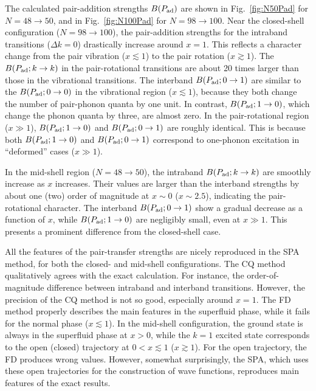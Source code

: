 \documentclass[%
superscriptaddress,
preprint,
showpacs,
nofootinbib,
amsmath,amssymb,
aps,
prc,
floatfix ]%
{revtex4-1}
\begin{document}
The calculated pair-addition strengths $B(P_{\rm ad})$ are shown in
Fig.~\ref{fig:N50Pad} for $N=48\rightarrow 50$,
and in Fig.~\ref{fig:N100Pad} for $N=98\rightarrow 100$.
Near the closed-shell configuration ($N=98\rightarrow 100$),
the pair-addition strengths for the intraband transitions ($\Delta k=0$)
drastically increase around $x=1$.
This reflects a character change from the pair vibration ($x\lesssim 1$)
to the pair rotation ($x\gtrsim 1$).
The $B(P_{\rm ad}; k\rightarrow k)$ in the pair-rotational transitions
are about 20 times larger than those in the vibrational transitions.
The interband $B(P_{\rm ad}; 0\rightarrow 1)$ are similar to
the $B(P_{\rm ad}; 0\rightarrow 0)$ in the vibrational region
($x\lesssim 1$), because they both change the number of pair-phonon quanta
by one unit.
In contrast, $B(P_{\rm ad}; 1\rightarrow 0)$, which change the phonon
quanta by three, are almost zero.
In the pair-rotational region ($x \gg 1$),
$B(P_{\rm ad}; 1\rightarrow 0)$ and $B(P_{\rm ad}; 0\rightarrow 1)$
are roughly identical. This is because both $B(P_{\rm ad}; 1\rightarrow 0)$ 
and $B(P_{\rm ad}; 0\rightarrow 1)$ correspond to one-phonon excitation
in ``deformed'' cases ($x \gg 1$).

In the mid-shell region ($N=48\rightarrow 50$),
the intraband $B(P_{\rm ad}; k\rightarrow k)$ are smoothly increase as
$x$ increases.
Their values are larger than the interband strengths by about one (two) order
of magnitude at $x\sim 0$ ($x\sim 2.5$),
indicating the pair-rotational character.
The interband $B(P_{\rm ad}; 0\rightarrow 1)$ show a gradual decrease
as a function of $x$, while
$B(P_{\rm ad}; 1\rightarrow 0)$ are negligibly small,
even at $x\gg 1$.
This presents a prominent difference from the closed-shell case.

All the features of the pair-transfer strengths
are nicely reproduced in the SPA method,
for both the closed- and mid-shell configurations.
The CQ method qualitatively agrees with the exact calculation.
For instance, the order-of-magnitude difference between intraband
and interband transitions.
However, the precision of the CQ method is not so good,
especially around $x=1$.
The FD method properly describes the main features
in the superfluid phase, while it fails for the normal phase
($x\lesssim 1$). 
In the mid-shell configuration, the ground state is always
in the superfluid phase at $x>0$,
while the $k=1$ excited state corresponds to
the open (closed) trajectory at $0<x\lesssim 1$ ($x\gtrsim 1$).
For the open trajectory, the FD produces wrong values.
However, somewhat surprisingly,
the SPA, which uses these open trajectories for the construction
of wave functions,
reproduces main features of the exact results.
\end{document}
